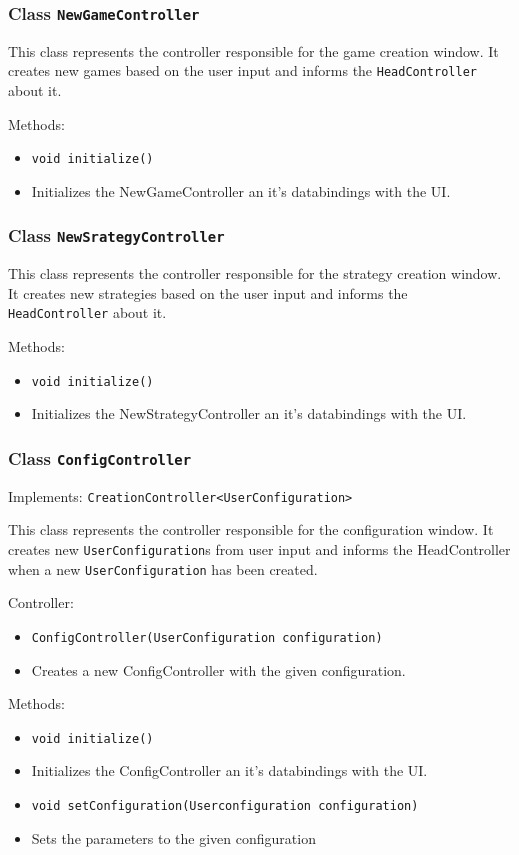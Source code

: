 \documentclass[parskip=full,11pt]{scrartcl}
\begin{document}
\subsubsection{Class \texttt{NewGameController}}
This class represents the controller responsible for the game creation window.
It creates new games based on the user input and informs the \texttt{HeadController} about it.

Methods:
\begin{itemize}\itemsep -10pt
\item \texttt{void initialize()}
\item[] Initializes the NewGameController an it's databindings with the UI.
\end{itemize}

\subsubsection{Class \texttt{NewSrategyController}}
This class represents the controller responsible for the strategy creation window. It creates new strategies based on the user input and informs the \texttt{HeadController} about it.

Methods:
\begin{itemize}\itemsep -10pt
\item \texttt{void initialize()}
\item[] Initializes the NewStrategyController an it's databindings with the UI.
\end{itemize}

\subsubsection{Class \texttt{ConfigController}}

Implements: \texttt{CreationController<UserConfiguration>}

This class represents the controller responsible for the configuration window. It creates new \texttt{UserConfiguration}s from user input and informs the HeadController when a new \texttt{UserConfiguration} has been created.

Controller:
\begin{itemize}\itemsep -10pt
\item \texttt{ConfigController(UserConfiguration configuration)}
\item[] Creates a new ConfigController with the given configuration.
\end{itemize}

Methods:
\begin{itemize}\itemsep -10pt
\item \texttt{void initialize()}
\item[] Initializes the ConfigController an it's databindings with the UI.

\item \texttt{void setConfiguration(Userconfiguration configuration)}
\item[] Sets the parameters to the given configuration

\end{itemize}
\end{document}
